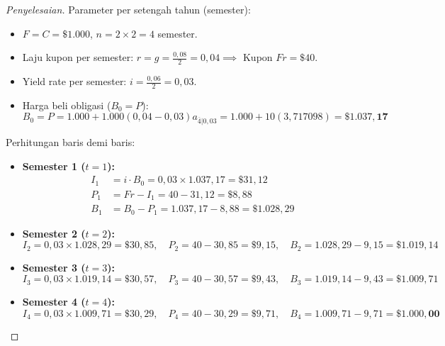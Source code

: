 \documentclass[11pt,a4paper]{article}
\begin{document}
\begin{proof}[Penyelesaian]
Parameter per setengah tahun (semester):
\begin{itemize}
    \item $F = C = \$1.000$, $n = 2 \times 2 = 4$ semester.
    \item Laju kupon per semester: $r = g = \frac{0{,}08}{2} = 0{,}04 \implies$ Kupon $Fr = \$40$.
    \item Yield rate per semester: $i = \frac{0{,}06}{2} = 0{,}03$.
    \item Harga beli obligasi ($B_0 = P$):
    \begin{equation*}
        B_0 = P = 1.000 + 1.000(0{,}04 - 0{,}03) a_{\overline{4}|0{,}03} = 1.000 + 10(3{,}717098) = \mathbf{\$1.037{,}17}
    \end{equation*}
\end{itemize}

Perhitungan baris demi baris:
\begin{itemize}
    \item \textbf{Semester 1 ($t=1$):}
    \begin{align*}
        I_1 &= i \cdot B_0 = 0{,}03 \times 1.037{,}17 = \$31{,}12 \\
        P_1 &= Fr - I_1 = 40 - 31{,}12 = \$8{,}88 \\
        B_1 &= B_0 - P_1 = 1.037{,}17 - 8{,}88 = \$1.028{,}29
    \end{align*}
    \item \textbf{Semester 2 ($t=2$):}
    \begin{equation*}
        I_2 = 0{,}03 \times 1.028{,}29 = \$30{,}85, \quad P_2 = 40 - 30{,}85 = \$9{,}15, \quad B_2 = 1.028{,}29 - 9{,}15 = \$1.019{,}14
    \end{equation*}
    \item \textbf{Semester 3 ($t=3$):}
    \begin{equation*}
        I_3 = 0{,}03 \times 1.019{,}14 = \$30{,}57, \quad P_3 = 40 - 30{,}57 = \$9{,}43, \quad B_3 = 1.019{,}14 - 9{,}43 = \$1.009{,}71
    \end{equation*}
    \item \textbf{Semester 4 ($t=4$):}
    \begin{equation*}
        I_4 = 0{,}03 \times 1.009{,}71 = \$30{,}29, \quad P_4 = 40 - 30{,}29 = \$9{,}71, \quad B_4 = 1.009{,}71 - 9{,}71 = \mathbf{\$1.000{,}00}
    \end{equation*}
\end{itemize}


\end{proof}
\end{document}
